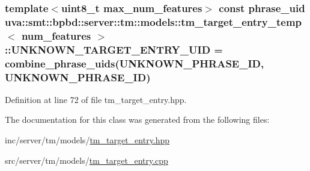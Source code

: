 \subsubsection[{U\+N\+K\+N\+O\+W\+N\+\_\+\+T\+A\+R\+G\+E\+T\+\_\+\+E\+N\+T\+R\+Y\+\_\+\+U\+I\+D}]{\setlength{\rightskip}{0pt plus 5cm}template$<$uint8\+\_\+t max\+\_\+num\+\_\+features$>$ const {\bf phrase\+\_\+uid} {\bf uva\+::smt\+::bpbd\+::server\+::tm\+::models\+::tm\+\_\+target\+\_\+entry\+\_\+temp}$<$ num\+\_\+features $>$\+::U\+N\+K\+N\+O\+W\+N\+\_\+\+T\+A\+R\+G\+E\+T\+\_\+\+E\+N\+T\+R\+Y\+\_\+\+U\+I\+D = combine\+\_\+phrase\+\_\+uids(U\+N\+K\+N\+O\+W\+N\+\_\+\+P\+H\+R\+A\+S\+E\+\_\+\+I\+D, U\+N\+K\+N\+O\+W\+N\+\_\+\+P\+H\+R\+A\+S\+E\+\_\+\+I\+D)\hspace{0.3cm}{\ttfamily [static]}}\label{classuva_1_1smt_1_1bpbd_1_1server_1_1tm_1_1models_1_1tm__target__entry__temp_adc270949b1ccda2bd58fa6950fa5ae6e}


Definition at line 72 of file tm\+\_\+target\+\_\+entry.\+hpp.



The documentation for this class was generated from the following files\+:\begin{DoxyCompactItemize}
\item 
inc/server/tm/models/\hyperlink{tm__target__entry_8hpp}{tm\+\_\+target\+\_\+entry.\+hpp}\item 
src/server/tm/models/\hyperlink{tm__target__entry_8cpp}{tm\+\_\+target\+\_\+entry.\+cpp}\end{DoxyCompactItemize}
